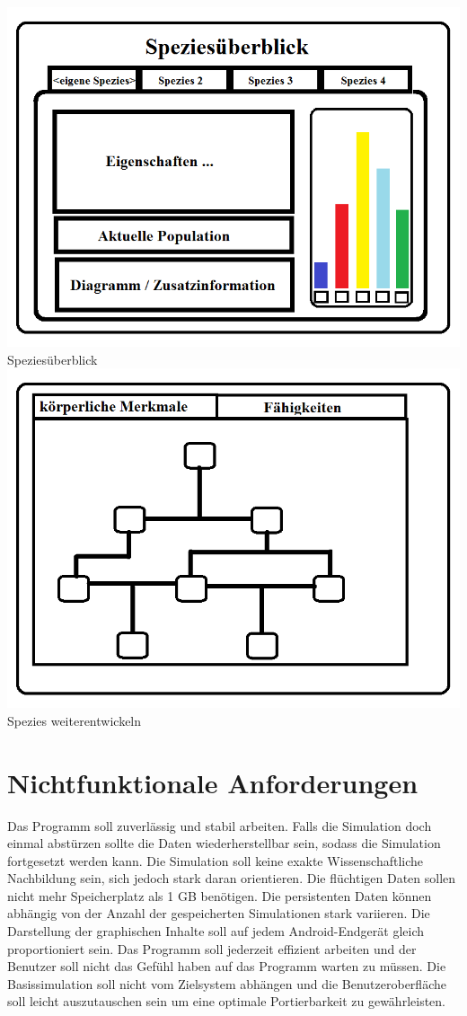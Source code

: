 \documentclass[a4paper, 10pt]{article}
\begin{document}
\begin{minipage}{49mm} 
\includegraphics[scale=0.45]{Bilder/Speziesuberblick.png}
Speziesüberblick
\includegraphics[scale=0.45]{Bilder/Fahigkeiten.png}
Spezies weiterentwickeln
\end{minipage}



\section{Nichtfunktionale Anforderungen}
Das Programm soll zuverlässig und stabil arbeiten.
Falls die Simulation doch einmal abstürzen sollte die Daten wiederherstellbar sein, sodass die Simulation fortgesetzt werden kann. Die Simulation soll keine exakte Wissenschaftliche Nachbildung sein, sich jedoch stark daran orientieren. Die flüchtigen Daten sollen nicht mehr Speicherplatz als 1 GB benötigen. Die persistenten Daten können abhängig von der Anzahl der gespeicherten Simulationen stark variieren. Die Darstellung der graphischen Inhalte soll auf jedem Android-Endgerät gleich proportioniert sein.
Das Programm soll jederzeit effizient arbeiten und der Benutzer soll nicht das Gefühl haben auf das Programm warten zu müssen. Die Basissimulation soll nicht vom Zielsystem abhängen und die Benutzeroberfläche soll leicht auszutauschen sein um eine optimale Portierbarkeit zu gewährleisten.
\end{document}
